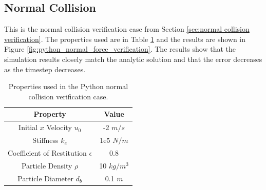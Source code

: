 \documentclass[a4paper,11pt,titlepage]{report}
\begin{document}
\subsection{Normal Collision}
This is the normal collision verification case from Section \ref{sec:normal collision verification}. The properties used are in Table \ref{tab:python normal collision properties} and the results are shown in Figure \ref{fig:python_normal_force_verification}. The results show that the simulation results closely match the analytic solution and that the error decreases as the timestep decreases.
\begin{table}[!htb]
\centering
\begin{tabular}{| c c |}
\hline
Property & Value\\
\hline
Initial $x$ Velocity $u_0$ & -2 $m/s$ \\
Stiffness $k_e$ & 1e5 $N/m$ \\
Coefficient of Restitution $\epsilon$ & 0.8 \\
Particle Density $\rho$ & 10 $kg/m^3$ \\
Particle Diameter $d_b$ & 0.1 $m$ \\
\hline
\end{tabular}
\caption{Properties used in the Python normal collision verification case.}
\label{tab:python normal collision properties}
\end{table}
\end{document}
